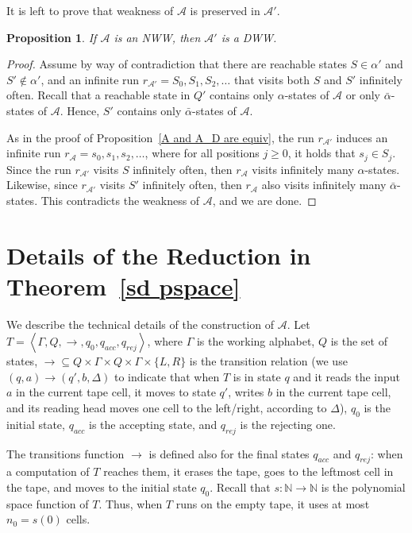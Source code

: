 \documentclass[10pt,a4paper]{amsart}
\newtheorem{prop}[thm]{Proposition}
\theoremstyle{definition}
\numberwithin{equation}{section}
\newcommand{\A}{{\mathcal A}}
\newcommand{\zug}[1]{\left\langle #1 \right\rangle}
\begin{document}
It is left to prove that weakness of $\A$ is preserved in $\A'$. 

\begin{prop}\label{NWW to DWW}
	If $\A$ is an NWW, then $\A'$ is a DWW.
\end{prop}

\begin{proof}
	Assume by way of contradiction that there are reachable states $S\in \alpha'$ and $S'\notin \alpha'$, and an infinite run $r_{\A'} = S_0, S_1, S_2, \ldots$ that visits both $S$ and $S'$ infinitely often. 
	Recall that a reachable state in $Q'$ contains only $\alpha$-states of $\A$ or only $\bar{\alpha}$-states of $\A$. Hence, $S'$ contains only $\bar{\alpha}$-states of $\A$. 
	
	As in the proof of Proposition~\ref{A and A_D are equiv}, the run $r_{\A'}$ induces an infinite run $r_\A = s_0, s_1, s_2, \ldots $, where for all positions $j \geq 0$, it holds that $s_j\in S_j$. Since the run $r_{\A'}$ visits $S$ infinitely often, then $r_\A$ visits infinitely many $\alpha$-states. Likewise, since $r_{\A'}$ visits  $S'$ infinitely often, then $r_\A$ also visits infinitely many $\bar{\alpha}$-states. This contradicts the weakness of $\A$, and we are done.
\end{proof}

\section{Details of the Reduction in Theorem~\ref{sd pspace}}
\label{app tm}


We describe the technical details of the construction of $\A$.
Let $T=\zug{\Gamma,Q,\rightarrow,q_0,q_{acc},q_{rej}}$, where $\Gamma$ is the working
alphabet, $Q$ is the set of states, $\rightarrow \subseteq Q \times
\Gamma \times Q \times \Gamma \times \{L,R\}$ is the transition
relation (we use $(q,a) \rightarrow (q',b,\Delta)$ to indicate that
when $T$ is in state $q$ and it reads the input $a$ in the current
tape cell, it moves to state $q'$, writes $b$ in the current tape
cell, and its reading head moves one cell to the left/right, according
to $\Delta$), $q_0$ is the initial state, $q_{acc}$ is the accepting state, and $q_{rej}$ is the rejecting one. 

The transitions function $\rightarrow$ is defined also for the final states $q_{acc}$ and $q_{rej}$: when a computation of $T$ reaches them, it erases the tape, goes to the leftmost cell in the tape, 
and moves to the initial state $q_0$. Recall that $s: \mathbb{N} \rightarrow \mathbb{N}$ is the polynomial space function of $T$. Thus, when $T$ runs on the empty tape, it uses at most $n_0=s(0)$ cells. 
\end{document}

